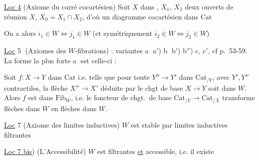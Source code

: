 
\uline{Loc 4} (Axiome du carré cocartésien) Soit $X$ dans , $X_1$, $X_2$ deux ouverts de réunion $X$, $X_0=X_1\cap X_2$, d'où un diagramme cocartésien dans $\mathrm{Cat}$


On a alors $i_1\in W\iff j_1\in W$ (et symétriquement $i_2\in W\iff j_2\in W$)


\uline{Loc} \textcircled{5} (Axiomes des $W$-fibrations) :   variantes \textcircled{a} a$'$) \textcircled{b} b$'$) b$''$) c, c$'$, cf \uline{} p.~53-59. La forme la plus forte \textcircled{a} est celle-ci :

Soit $f:X\longrightarrow Y$ dans $\mathrm{Cat}$    i.e. telle que pour toute $Y''\to Y'$ dans $\mathrm{Cat}_{/Y}$, avec $Y',Y''$ contractiles,  la flèche $X''\to X'$ déduite par le chgt de base $X\to Y$ soit dans $W$. Alors $f$ est dans $\mathrm{Fib}_W$, i.e. le foncteur de chgt.\ de base  $\mathrm{Cat}_{/Y}\to\mathrm{Cat}_{/X}$ transforme flèches dans $W$ en flèches dans $W$.



\uline{Loc} 7 (Axiome des limites inductives) $W$ est stable par limites inductives filtrantes


\uline{Loc 7 bis}) (L'Accessibilité) $W$ est  filtrantes \uline{et} accessible, i.e. il existe

